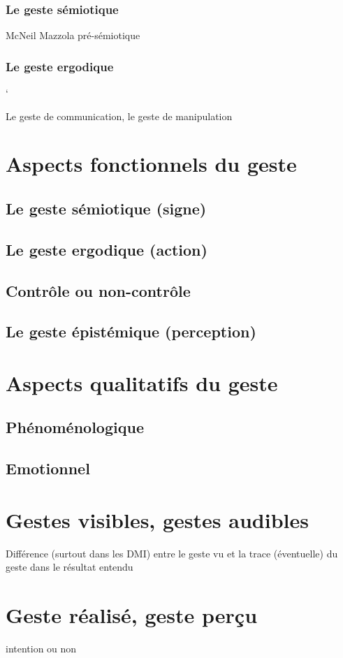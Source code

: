 		\subsubsection{Le geste sémiotique}
			McNeil
			Mazzola pré-sémiotique
		\subsubsection{Le geste ergodique}`


Le geste de communication, le geste de manipulation


\section{Aspects fonctionnels du geste}
	\subsection{Le geste sémiotique (signe)}
	\subsection{Le geste ergodique (action)}
	\subsection{Contrôle ou non-contrôle}
	\subsection{Le geste épistémique (perception)}
\section{Aspects qualitatifs du geste}
	\subsection{Phénoménologique}
	\subsection{Emotionnel}


\section{Gestes visibles, gestes audibles}
Différence (surtout dans les DMI) entre le geste vu et la trace (éventuelle) du geste dans le résultat entendu

\section{Geste réalisé, geste perçu}
intention ou non


